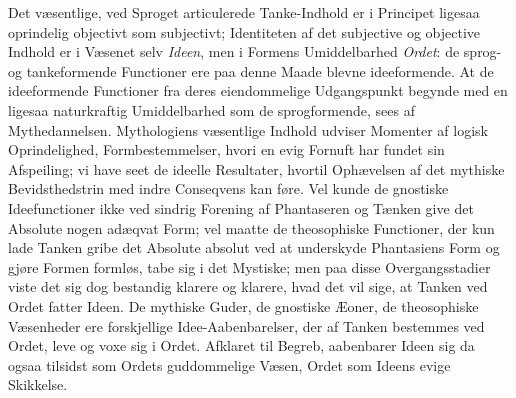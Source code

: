 \documentclass[12pt]{book}
\newcommand{\opage}[1]{\marginnote{\footnotesize\textit{[#1]}}}
\begin{document}
Det væsentlige, ved Sproget articulerede Tanke-Indhold
er i Principet ligesaa oprindelig objectivt som subjectivt;
Identiteten af det subjective og objective Indhold er i Væsenet
selv \emph{Ideen}, men i Formens Umiddelbarhed \emph{Ordet}: de
sprog- og tankeformende Functioner ere paa denne Maade
blevne ideeformende. At de ideeformende Functioner fra deres
\opage{286}eiendommelige Udgangspunkt begynde med en ligesaa naturkraftig
Umiddelbarhed som de sprogformende, sees af Mythedannelsen.
Mythologiens væsentlige Indhold udviser Momenter af logisk
Oprindelighed, Formbestemmelser, hvori en evig Fornuft har
fundet sin Afspeiling; vi have seet de ideelle Resultater, hvortil
Ophævelsen af det mythiske Bevidsthedstrin med indre Conseqvens
kan føre. Vel kunde de gnostiske Ideefunctioner ikke
ved sindrig Forening af Phantaseren og Tænken give det Absolute
nogen adæqvat Form; vel maatte de theosophiske Functioner,
der kun lade Tanken gribe det Absolute absolut ved
at underskyde Phantasiens Form og gjøre Formen formløs,
tabe sig i det Mystiske; men paa disse Overgangsstadier viste
det sig dog bestandig klarere og klarere, hvad det vil sige, at
Tanken ved Ordet fatter Ideen. De mythiske Guder, de
gnostiske Æoner, de theosophiske Væsenheder ere forskjellige
Idee-Aabenbarelser, der af Tanken bestemmes ved Ordet, leve
og voxe sig i Ordet. Afklaret til Begreb, aabenbarer Ideen
sig da ogsaa tilsidst som Ordets guddommelige Væsen, Ordet
som Ideens evige Skikkelse.
\end{document}

